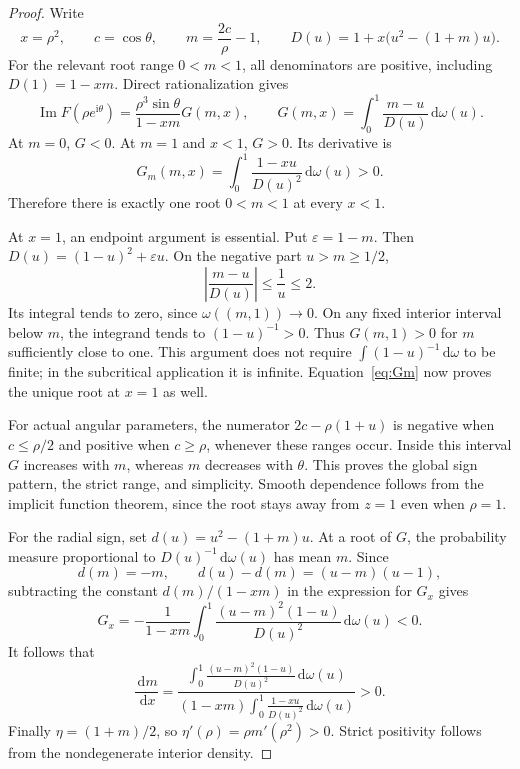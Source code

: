 \documentclass[11pt]{article}
\numberwithin{equation}{section}
\theoremstyle{definition}
\theoremstyle{remark}
\DeclareMathOperator{\Impart}{Im}
\newcommand{\dd}{\,\mathrm d}
\newcommand{\ii}{\mathrm i}
\begin{document}
\begin{proof}
Write
\[
 x=\rho^2,\qquad c=\cos\theta,\qquad
 m=\frac{2c}{\rho}-1,\qquad
 D(u)=1+x\bigl(u^2-(1+m)u\bigr).
\]
For the relevant root range $0<m<1$, all denominators are positive,
including $D(1)=1-xm$. Direct rationalization gives
\begin{equation}\label{eq:angularG}
 \Impart F(\rho e^{\ii\theta})
 =\frac{\rho^3\sin\theta}{1-xm}G(m,x),\qquad
 G(m,x)=\int_0^1\frac{m-u}{D(u)}\dd\omega(u).
\end{equation}
At $m=0$, $G<0$. At $m=1$ and $x<1$, $G>0$. Its derivative is
\begin{equation}\label{eq:Gm}
 G_m(m,x)=\int_0^1\frac{1-xu}{D(u)^2}\dd\omega(u)>0.
\end{equation}
Therefore there is exactly one root $0<m<1$ at every $x<1$.

At $x=1$, an endpoint argument is essential. Put $\varepsilon=1-m$.
Then $D(u)=(1-u)^2+\varepsilon u$. On the negative part $u>m\ge1/2$,
\[
 \left|\frac{m-u}{D(u)}\right|\le\frac1u\le2.
\]
Its integral tends to zero, since $\omega((m,1))\to0$. On any fixed
interior interval below $m$, the integrand tends to $(1-u)^{-1}>0$.
Thus $G(m,1)>0$ for $m$ sufficiently close to one. This argument does
not require $\int(1-u)^{-1}\dd\omega$ to be finite; in the subcritical
application it is infinite. Equation~\eqref{eq:Gm} now proves the
unique root at $x=1$ as well.

For actual angular parameters, the numerator $2c-\rho(1+u)$ is
negative when $c\le\rho/2$ and positive when $c\ge\rho$, whenever
these ranges occur. Inside this interval $G$ increases with $m$,
whereas $m$ decreases with $\theta$. This proves the global sign
pattern, the strict range, and simplicity. Smooth dependence follows
from the implicit function theorem, since the root stays away from
$z=1$ even when $\rho=1$.

For the radial sign, set $d(u)=u^2-(1+m)u$. At a root of $G$, the
probability measure proportional to $D(u)^{-1}\dd\omega(u)$ has mean
$m$. Since
\[
 d(m)=-m,\qquad d(u)-d(m)=(u-m)(u-1),
\]
subtracting the constant $d(m)/(1-xm)$ in the expression for $G_x$
gives
\[
 G_x=-\frac1{1-xm}\int_0^1
              \frac{(u-m)^2(1-u)}{D(u)^2}\dd\omega(u)<0.
\]
It follows that
\begin{equation}\label{eq:radialderivative}
 \frac{\dd m}{\dd x}=
 \frac{\displaystyle\int_0^1
              \frac{(u-m)^2(1-u)}{D(u)^2}\dd\omega(u)}
 {(1-xm)\displaystyle\int_0^1
              \frac{1-xu}{D(u)^2}\dd\omega(u)}>0.
\end{equation}
Finally $\eta=(1+m)/2$, so $\eta'(\rho)=\rho m'(\rho^2)>0$.
Strict positivity follows from the nondegenerate interior density.
\end{proof}
\end{document}
